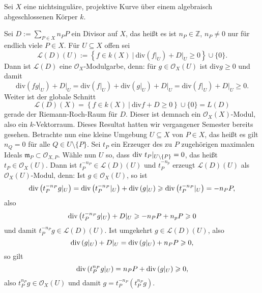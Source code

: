 \documentclass[11pt]{book}
\theoremstyle{nonumberbreak}
\newenvironment{ex}[1][]{\ifthenelse{\equal{#1}{}}{\example}{\example[#1]}\rm}{\endexample}
\begin{document}
\begin{spacing}{1.4}
\begin{ex}    %
Sei $X$ eine nichtsinguläre, projektive Kurve über einem algebraisch abgeschlossenen Körper $k$. 
\begin{compactenum}
\item Sei $D:= \sum_{P \in X} n_P P$ ein Divisor auf $X$, das heißt es ist $n_P \in \mathbb{Z}$, $n_P \neq 0$ nur für endlich viele $P \in X$. Für $U \subseteq X$ offen sei 
$$\mathcal{L}(D)(U) := \left\{ f \in k(X) \ \vert \ \textrm{div} \left(f\vert_U\right) + D\vert_U \geqslant 0 \right\} \cup \{0\}.$$
Dann ist $\mathcal{L}(D)$ eine $\mathcal{O}_X$-Modulgarbe, denn: für $g \in \mathcal{O}_X(U)$ ist $\textrm{div}g \geqslant 0$ und damit
$$\textrm{div} \left(fg \vert_U\right) + D\vert_U = \textrm{div} \left(f\vert_U\right) + \textrm{div}\left(g\vert_U\right) + D\vert_U = \textrm{div}\left(f\vert_U\right) + D\vert_U \geqslant 0.$$
Weiter ist der globale Schnitt
$$\mathcal{L}(D)(X) = \left\{f \in k(X) \ \vert \ \textrm{div}f + D \geqslant 0 \right\} \cup \{0\} = L(D)$$
gerade der Riemann-Roch-Raum für $D$. Dieser ist demnach ein $\mathcal{O}_X(X)$-Modul, also ein $k$-Vektorraum. Dieses Resultat hatten wir vergangener Semester bereits gesehen. Betrachte nun eine kleine Umgebung $U \subseteq X$ von $P \in X$, das heißt es gilt $n_Q = 0$ für alle $Q \in U \setminus \{P\}$. Sei $t_P$ ein Erzeuger des zu $P$ zugehörigen maximalen Ideals $\mathfrak{m}_P \subset \mathcal{O}_{X,P}$. Wähle nun $U$ so, dass $\textrm{div} \ t_P \vert_{U \setminus \{P\}} =0$, das heißt $t_P \in \mathcal{O}_X(U)$. Dann ist $t_P^{-n_P} \in \mathcal{L}(D)(U)$ und $t_P^{-n_p}$ erzeugt $\mathcal{L}(D)(U)$ als $\mathcal{O}_X(U)$-Modul, denn: Ist $g \in \mathcal{O}_X(U)$, so ist $$\textrm{div} \left(t_P^{-n_P} g \vert_U \right) = \textrm{div}\left(t_P^{-n_P} \vert_U\right) + \textrm{div} \left(g \vert_U\right) \geqslant \textrm{div} \left(t_P^{-n_P} \vert_U\right) = -n_P P,$$
also
$$\textrm{div} \left(t_P^{-n_P} g \vert_U\right) + D\vert_U \geqslant -n_PP + n_pP \geqslant 0$$
und damit $t_P^{-n_P} g \in \mathcal{L}(D)(U)$. Ist umgekehrt $g \in \mathcal{L}(D)(U)$, also $$\textrm{div} \left(g \vert_U\right) + D\vert_U = \textrm{div}\left(g \vert_U\right) + n_P P \geqslant 0,$$
so gilt 
$$\textrm{div}\left(t_P^{n_P} g \vert_U\right) = n_P P + \textrm{div} \left(g \vert_U\right) \geqslant 0,$$
also $t_P^{n_P} g \in \mathcal{O}_X(U)$ und damit $g= t_P^{-n_P} \left( t_P^{n_P} g \right)$.



\end{compactenum}
\end{ex}
\end{spacing}
\end{document}
